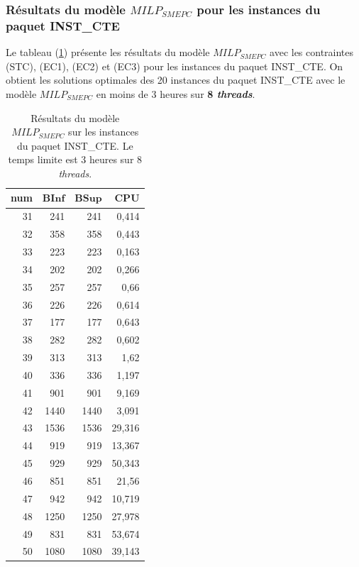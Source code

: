 {\subsubsection{Résultats du modèle $MILP_{SMEPC}$ pour les instances du paquet INST\_CTE}
Le tableau (\ref{tab:resultSYM_STC2}) présente les résultats du modèle $MILP_{SMEPC}$ avec les contraintes (STC), (EC1), (EC2) et (EC3) pour les instances du paquet INST\_CTE. On obtient les solutions optimales des 20 instances du paquet INST\_CTE avec le modèle $MILP_{SMEPC}$ en moins de 3 heures sur \textbf{8 \textit{threads}}.
\begin{table}[H]
	\centering
	\small{
		\begin{tabular}{|r|r|r|r|}
			\hline
			\toprule
			\rowcolor{cyan}	\textbf{num} &$\mathbf{BInf}$ & $\mathbf{BSup}$ & $\mathbf{CPU}$   \\
			\midrule
			\hline
			31	&	241	&	241	&	0,414	\\ \hline
			32	&	358	&	358	&	0,443	\\ \hline
			33	&	223	&	223	&	0,163	\\ \hline
			34	&	202	&	202	&	0,266	\\ \hline
			35	&	257	&	257	&	0,66	\\ \hline
			36	&	226	&	226	&	0,614	\\ \hline
			37	&	177	&	177	&	0,643	\\ \hline
			38	&	282	&	282	&	0,602	\\ \hline
			39	&	313	&	313	&	1,62	\\ \hline
			40	&	336	&	336	&	1,197	\\ \hline
			41	&	901	&	901	&	9,169	\\ \hline
			42	&	1440	&	1440	&	3,091	\\ \hline
			43	&	1536	&	1536	&	29,316	\\ \hline
			44	&	919	&	919	&	13,367	\\ \hline
			45	&	929	&	929	&	50,343	\\ \hline
			46	&	851	&	851	&	21,56	\\ \hline
			47	&	942	&	942	&	10,719	\\ \hline
			48	&	1250	&	1250	&	27,978	\\ \hline
			49	&	831	&	831	&	53,674	\\ \hline
			50	&	1080	&	1080	&	39,143	\\ \hline
			
			
			\bottomrule
		\end{tabular}%
	}\caption[Résultats de $MILP_{SMEPC}$ sur INST\_CTE. Le temps limite est 3 heures sur 8 \textit{threads}]{Résultats du modèle $MILP_{SMEPC}$ sur les instances du paquet INST\_CTE. Le temps limite est 3 heures sur 8 \textit{threads}.}
	\label{tab:resultSYM_STC2}%
\end{table}%

}
